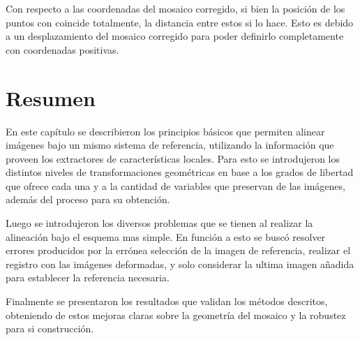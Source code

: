 Con respecto a las coordenadas del mosaico corregido, si bien la posición de los puntos con coincide totalmente, la distancia entre estos si lo hace. Esto es debido a un desplazamiento del mosaico corregido para poder definirlo completamente con coordenadas positivas. 

\section{Resumen}

En este capítulo se describieron los principios básicos que permiten alinear imágenes bajo un mismo sistema de referencia, utilizando la información que proveen los extractores de características locales. Para esto se introdujeron los distintos niveles de transformaciones geométricas en base a los grados de libertad que ofrece cada una y a la cantidad de variables que preservan de las imágenes, además del proceso para su obtención.

Luego se introdujeron los diversos problemas que se tienen al realizar la alineación bajo el esquema mas simple. En función a esto se buscó resolver errores producidos por la errónea selección de la imagen de referencia, realizar el registro con las imágenes deformadas, y solo considerar la ultima imagen añadida para establecer la referencia necesaria.

Finalmente se presentaron los resultados que validan los métodos descritos, obteniendo de estos mejoras claras sobre la geometría del mosaico y la robustez para si construcción.


